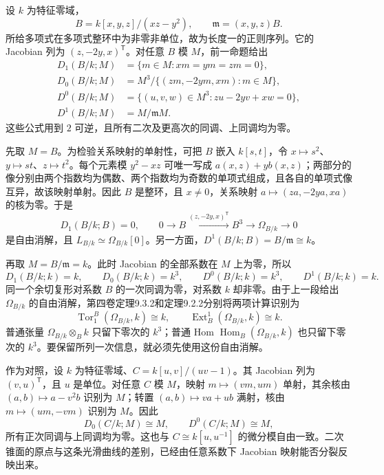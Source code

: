 \begin{example}[二次锥面与原点系数]\label{b3:exm:C-aq-quadric-cone}
	设 \(k\) 为特征零域，
	\[
		B=k[x,y,z]/(xz-y^2),\qquad\mathfrak m=(x,y,z)B.
	\]
	所给多项式在多项式整环中为非零非单位，故为长度一的正则序列。它的 Jacobian 列为 \((z,-2y,x)^{\mathsf T}\)。对任意 \(B\) 模 \(M\)，前一命题给出
	\[
		\begin{aligned}
			D_1(B/k;M)&=\{m\in M:xm=ym=zm=0\},\\
			D_0(B/k;M)&=M^3/\{(zm,-2ym,xm):m\in M\},\\
			D^0(B/k;M)&=\{(u,v,w)\in M^3:zu-2yv+xw=0\},\\
			D^1(B/k;M)&=M/\mathfrak mM.
		\end{aligned}
	\]
	这些公式用到 \(2\) 可逆，且所有二次及更高次的同调、上同调均为零。

	\ProseParagraphBreak
	先取 \(M=B\)。为检验关系映射的单射性，可把 \(B\) 嵌入 \(k[s,t]\)，令 \(x\mapsto s^2\)、\(y\mapsto st\)、\(z\mapsto t^2\)。每个元素模 \(y^2-xz\) 可唯一写成 \(a(x,z)+yb(x,z)\)；两部分的像分别由两个指数均为偶数、两个指数均为奇数的单项式组成，且各自的单项式像互异，故该映射单射。因此 \(B\) 是整环，且 \(x\ne0\)，关系映射 \(a\mapsto(za,-2ya,xa)\) 的核为零。于是
	\[
		D_1(B/k;B)=0,\qquad
		0\longrightarrow B\xrightarrow{(z,-2y,x)^{\mathsf T}}B^3\longrightarrow\Omega_{B/k}\longrightarrow0
	\]
	是自由消解，且 \(L_{B/k}\simeq\Omega_{B/k}[0]\)。另一方面，\(D^1(B/k;B)=B/\mathfrak m\cong k\)。

	\ProseParagraphBreak
	再取 \(M=B/\mathfrak m=k\)。此时 Jacobian 的全部系数在 \(M\) 上为零，所以
	\[
		D_1(B/k;k)=k,\qquad D_0(B/k;k)=k^3,\qquad
		D^0(B/k;k)=k^3,\qquad D^1(B/k;k)=k.
	\]
	同一个余切复形对系数 \(B\) 的一次同调为零，对系数 \(k\) 却非零。由于上一段给出 \(\Omega_{B/k}\) 的自由消解，第四卷定理9.3.2和定理9.2.2分别将两项计算识别为
	\[
		\operatorname{Tor}_1^B(\Omega_{B/k},k)\cong k,\qquad
		\operatorname{Ext}_B^1(\Omega_{B/k},k)\cong k.
	\]
	普通张量 \(\Omega_{B/k}\otimes_Bk\) 只留下零次的 \(k^3\)；普通 Hom \(\operatorname{Hom}_B(\Omega_{B/k},k)\) 也只留下零次的 \(k^3\)。要保留所列一次信息，就必须先使用这份自由消解。
\end{example}

作为对照，设 \(k\) 为特征零域、\(C=k[u,v]/(uv-1)\)。其 Jacobian 列为 \((v,u)^{\mathsf T}\)，且 \(u\) 是单位。对任意 \(C\) 模 \(M\)，映射 \(m\mapsto(vm,um)\) 单射，其余核由 \((a,b)\mapsto a-v^2b\) 识别为 \(M\)；转置 \((a,b)\mapsto va+ub\) 满射，核由 \(m\mapsto(um,-vm)\) 识别为 \(M\)。因此
\[
	D_0(C/k;M)\cong M,\qquad D^0(C/k;M)\cong M,
\]
所有正次同调与上同调均为零。这也与 \(C\cong k[u,u^{-1}]\) 的微分模自由一致。二次锥面的原点与这条光滑曲线的差别，已经由任意系数下 Jacobian 映射能否分裂反映出来。
